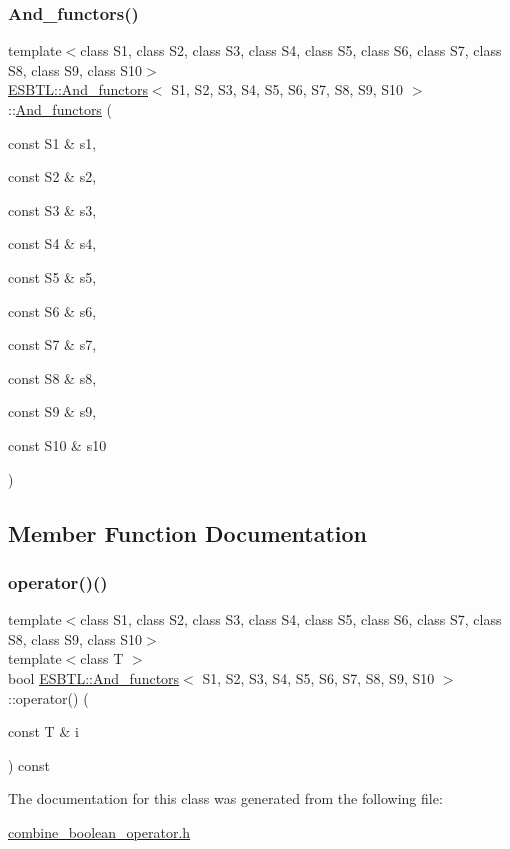 \subsubsection{\texorpdfstring{And\+\_\+functors()}{And\_functors()}\hspace{0.1cm}{\footnotesize\ttfamily [2/2]}}
{\footnotesize\ttfamily template$<$class S1, class S2, class S3, class S4, class S5, class S6, class S7, class S8, class S9, class S10$>$ \\
\hyperlink{classESBTL_1_1And__functors}{E\+S\+B\+T\+L\+::\+And\+\_\+functors}$<$ S1, S2, S3, S4, S5, S6, S7, S8, S9, S10 $>$\+::\hyperlink{classESBTL_1_1And__functors}{And\+\_\+functors} (\begin{DoxyParamCaption}\item[{const S1 \&}]{s1,  }\item[{const S2 \&}]{s2,  }\item[{const S3 \&}]{s3,  }\item[{const S4 \&}]{s4,  }\item[{const S5 \&}]{s5,  }\item[{const S6 \&}]{s6,  }\item[{const S7 \&}]{s7,  }\item[{const S8 \&}]{s8,  }\item[{const S9 \&}]{s9,  }\item[{const S10 \&}]{s10 }\end{DoxyParamCaption})\hspace{0.3cm}{\ttfamily [inline]}}



\subsection{Member Function Documentation}
\mbox{\label{classESBTL_1_1And__functors_aa612248c6e953a1ad6598b17ed3f8c80}} 
\subsubsection{\texorpdfstring{operator()()}{operator()()}}
{\footnotesize\ttfamily template$<$class S1, class S2, class S3, class S4, class S5, class S6, class S7, class S8, class S9, class S10$>$ \\
template$<$class T $>$ \\
bool \hyperlink{classESBTL_1_1And__functors}{E\+S\+B\+T\+L\+::\+And\+\_\+functors}$<$ S1, S2, S3, S4, S5, S6, S7, S8, S9, S10 $>$\+::operator() (\begin{DoxyParamCaption}\item[{const T \&}]{i }\end{DoxyParamCaption}) const\hspace{0.3cm}{\ttfamily [inline]}}



The documentation for this class was generated from the following file\+:\begin{DoxyCompactItemize}
\item 
\hyperlink{combine__boolean__operator_8h}{combine\+\_\+boolean\+\_\+operator.\+h}\end{DoxyCompactItemize}
